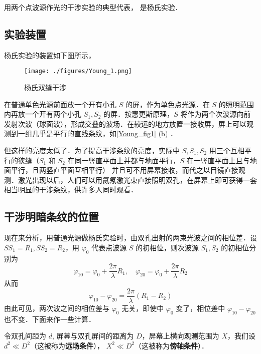 

用两个点波源作光的干涉实验的典型代表， 是杨氏实验．
\subsection{实验装置}
杨氏实验的装置如下图所示，
\begin{figure}[ht]
\centering
\texttt{[image: ./figures/Young\_1.png]}
\caption{杨氏双缝干涉} \label{Young_fig1}
\end{figure}
在普通单色光源前面放一个开有小孔 $S$ 的屏，作为单色点光源．在 $S $ 的照明范围内再放一个开有两个小孔 $S_1,S_2$ 的屏．按惠更斯原理，$S$ 将作为两个次波源向前发射次波（球面波），形成交叠的波场．在较远的地方放置一接收屏，屏上可以观测到一组几乎是平行的直线条纹，如\autoref{Young_fig1} (b) ．

但这样的亮度太低了．为了提高干涉条纹的亮度，实际中 $S,S_1,S_2$ 用三个互相平行的狭缝（$S_1$ 和 $S_2$ 在同一竖直平面上并都与地面平行，$S$ 在一竖直平面上且与地面平行，且两竖直平面互相平行）
并且可不用屏幕接收，而代之以目镜直接观测．激光出现以后，人们可以用氦氖激光束直接照明双孔，在屏幕上即可获得一套相当明显的干涉条纹，供许多人同时观看．

\subsection{干涉明暗条纹的位置}
现在来分析，用普通光源做杨氏实验时，由双孔出射的两束光波之间的相位差．设 $SS_1=R_1,SS_2=R_2$，用 $\varphi_0$ 代表点波源 $S$ 的初相位，则次波源 $S_1,S_2$ 的初相位分别为
\begin{equation}
\varphi_{10}=\varphi_{0}+\frac{2 \pi}{\lambda} R_{1}, \quad \varphi_{20}=\varphi_{0}+\frac{2 \pi}{\lambda} R_{2}
\end{equation}
从而
\begin{equation}
\varphi_{10}-\varphi_{20}=\frac{2 \pi}{\lambda}\left(R_{1}-R_{2}\right)
\end{equation}
由此可见，两次波之间的相位差与 $\varphi_0$ 无关，即使中 $\varphi_0$ 变了，相位差中 $\varphi_{10}-\varphi_{20}$ 也不变．下面来作一些计算．

令双孔间距为 $d$, 屏幕与双孔屏间的距离为 $D$，屏幕上横向观测范围为 $X$，我们设 $d^{2} \ll D^{2}$（这被称为\textbf{远场条件}）， $X^{2} \ll D^{2}$（这被称为\textbf{傍轴条件}）．

